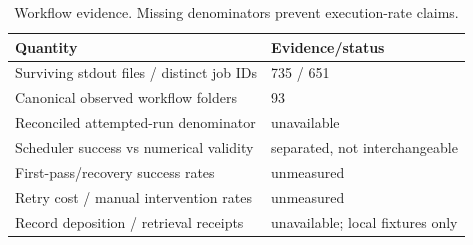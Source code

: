 \documentclass[11pt]{article}
\begin{document}
\begin{table}[ht]\centering\small
\caption{Workflow evidence. Missing denominators prevent execution-rate claims.}\label{tab:execution}
\begin{tabular}{ll}\toprule Quantity & Evidence/status\\\midrule
Surviving stdout files / distinct job IDs & 735 / 651\\
Canonical observed workflow folders & 93\\
Reconciled attempted-run denominator & unavailable\\
Scheduler success vs numerical validity & separated, not interchangeable\\
First-pass/recovery success rates & unmeasured\\
Retry cost / manual intervention rates & unmeasured\\
Record deposition / retrieval receipts & unavailable; local fixtures only\\\bottomrule
\end{tabular}\end{table}
\end{document}
